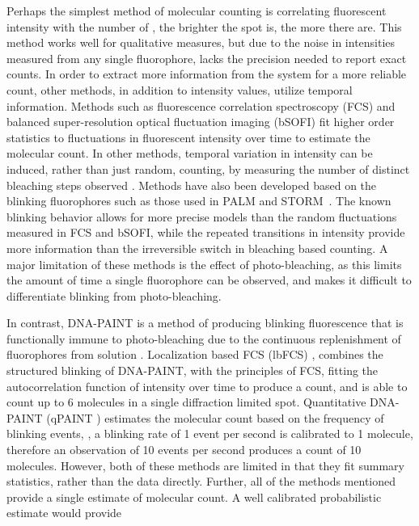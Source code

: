Perhaps the simplest method of molecular counting is correlating fluorescent
  intensity with the number of \smallobjects \cite{schmied_2012, tolar_2005}, \ie the brighter the spot is, the more there are.
  This method works well for qualitative measures, but due to the noise in intensities 
  measured from any single fluorophore, lacks the precision needed to report exact counts.
  In order to extract more information from the system for a more reliable count, other methods, 
  in addition to intensity values, utilize temporal information.
  Methods such as fluorescence correlation spectroscopy (FCS) \cite{otsuka_2023, wachsmuth_2015, politi_2018} and 
  balanced super-resolution optical fluctuation imaging (bSOFI) \cite{geissbuehler_2012}
  fit higher order statistics to fluctuations in fluorescent intensity over time to estimate the molecular count.
  In other methods, temporal variation in intensity can be induced, rather than just random, \ie
  counting, by measuring the number of distinct bleaching steps observed \cite{ulbrich_2007, jain_2011, hummert_2021}.
  Methods have also been developed based on the blinking fluorophores \cite{rollins_stochastic_2015, nino_2017} 
  such as those used in PALM \cite{sengupta_pcPALM_2011, lee_counting_2012} and STORM~\cite{patel_blinking_2021}. 
  The known blinking behavior allows for more precise models than the random fluctuations measured in FCS and bSOFI, while the 
  repeated transitions in intensity provide more information than the irreversible switch in bleaching based counting.
  A major limitation of these methods is the effect of photo-bleaching, as this limits the amount of time
  a single fluorophore can be observed, and makes it difficult to differentiate blinking from photo-bleaching.


In contrast, DNA-PAINT \cite{schnitzbauer_2017} is a method of producing blinking fluorescence that is functionally
    immune to photo-bleaching due to the continuous replenishment of fluorophores from solution \cite{stehr_2021}.
    Localization based FCS (lbFCS) \cite{stein_2019, stein_2021}, combines the structured blinking of DNA-PAINT, with the 
    principles of FCS, fitting the autocorrelation function of intensity over time to produce a count,
    and is able to count up to 6 molecules in a single diffraction limited spot.
    Quantitative DNA-PAINT (qPAINT \cite{jungmann_2016}) estimates the molecular count based on the frequency of blinking events, \ie, 
    a blinking rate of 1 event per second is calibrated to 1 molecule, therefore an observation of 10 events per second
    produces a count of 10 molecules.
    However, both of these methods are limited in that they fit summary statistics,
    rather than the data directly. 
    Further, all of the methods mentioned provide a single estimate of molecular count.
    A well calibrated probabilistic estimate would provide 
    
